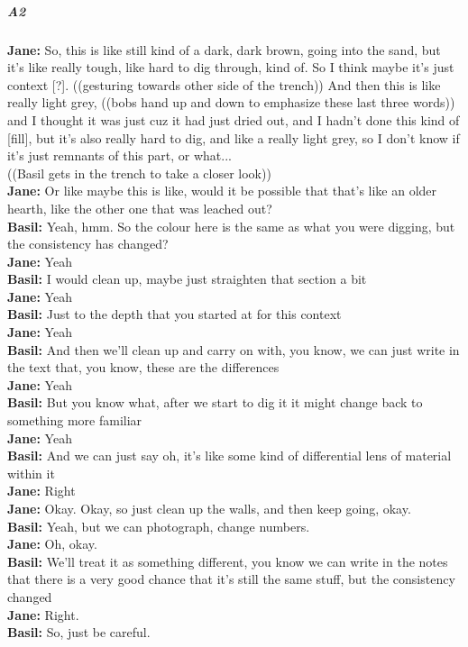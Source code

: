 \documentclass[
]{article}
\begin{document}
\subparagraph{A2}\label{sec-A2}

\textbf{Jane:} So, this is like still kind of a dark, dark brown, going
into the sand, but it's like really tough, like hard to dig through,
kind of. So I think maybe it's just context {[}?{]}. ((gesturing towards
other side of the trench)) And then this is like really light grey,
((bobs hand up and down to emphasize these last three words)) and I
thought it was just cuz it had just dried out, and I hadn't done this
kind of {[}fill{]}, but it's also really hard to dig, and like a really
light grey, so I don't know if it's just remnants of this part, or
what...\\
((Basil gets in the trench to take a closer look))\\
\textbf{Jane:} Or like maybe this is like, would it be possible that
that's like an older hearth, like the other one that was leached out?\\
\textbf{Basil:} Yeah, hmm. So the colour here is the same as what you
were digging, but the consistency has changed?\\
\textbf{Jane:} Yeah\\
\textbf{Basil:} I would clean up, maybe just straighten that section a
bit\\
\textbf{Jane:} Yeah\\
\textbf{Basil:} Just to the depth that you started at for this context\\
\textbf{Jane:} Yeah\\
\textbf{Basil:} And then we'll clean up and carry on with, you know, we
can just write in the text that, you know, these are the differences\\
\textbf{Jane:} Yeah\\
\textbf{Basil:} But you know what, after we start to dig it it might
change back to something more familiar\\
\textbf{Jane:} Yeah\\
\textbf{Basil:} And we can just say oh, it's like some kind of
differential lens of material within it\\
\textbf{Jane:} Right\\
\textbf{Jane:} Okay. Okay, so just clean up the walls, and then keep
going, okay.\\
\textbf{Basil:} Yeah, but we can photograph, change numbers.\\
\textbf{Jane:} Oh, okay.\\
\textbf{Basil:} We'll treat it as something different, you know we can
write in the notes that there is a very good chance that it's still the
same stuff, but the consistency changed\\
\textbf{Jane:} Right.\\
\textbf{Basil:} So, just be careful.
\end{document}

